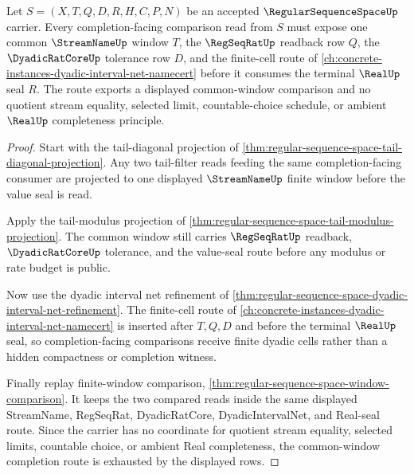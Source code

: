 \begin{theorem}
\label{thm:regular-sequence-space-common-window-completion-route}
Let $S=(X,T,Q,D,R,H,C,P,N)$ be an accepted $\RegularSequenceSpaceUp$ carrier. Every completion-facing comparison read from $S$ must expose one common $\StreamNameUp$ window $T$, the $\RegSeqRatUp$ readback row $Q$, the $\DyadicRatCoreUp$ tolerance row $D$, and the finite-cell route of \autoref{ch:concrete-instances-dyadic-interval-net-namecert} before it consumes the terminal $\RealUp$ seal $R$. The route exports a displayed common-window comparison and no quotient stream equality, selected limit, countable-choice schedule, or ambient $\RealUp$ completeness principle.
\end{theorem}
\begin{proof}
Start with the tail-diagonal projection of \autoref{thm:regular-sequence-space-tail-diagonal-projection}. Any two tail-filter reads feeding the same completion-facing consumer are projected to one displayed $\StreamNameUp$ finite window before the value seal is read.

Apply the tail-modulus projection of \autoref{thm:regular-sequence-space-tail-modulus-projection}. The common window still carries $\RegSeqRatUp$ readback, $\DyadicRatCoreUp$ tolerance, and the value-seal route before any modulus or rate budget is public.

Now use the dyadic interval net refinement of \autoref{thm:regular-sequence-space-dyadic-interval-net-refinement}. The finite-cell route of \autoref{ch:concrete-instances-dyadic-interval-net-namecert} is inserted after $T,Q,D$ and before the terminal $\RealUp$ seal, so completion-facing comparisons receive finite dyadic cells rather than a hidden compactness or completion witness.

Finally replay finite-window comparison, \autoref{thm:regular-sequence-space-window-comparison}. It keeps the two compared reads inside the same displayed StreamName, RegSeqRat, DyadicRatCore, DyadicIntervalNet, and Real-seal route. Since the carrier has no coordinate for quotient stream equality, selected limits, countable choice, or ambient Real completeness, the common-window completion route is exhausted by the displayed rows.
\end{proof}

